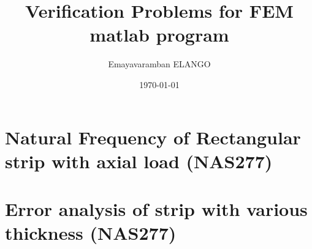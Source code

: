 \documentclass[a4paper]{article}
\begin{document}
\title{Verification Problems for FEM matlab program}
\author{Emayavaramban ELANGO}
\date{\today}





\section{Natural Frequency of Rectangular strip with axial load (NAS277)}

%




\newpage
\section{Error analysis of strip with various thickness (NAS277)}

%


\end{document}
